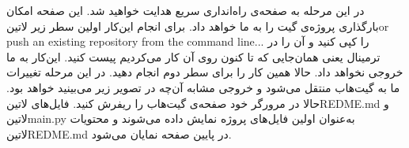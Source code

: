 در این مرحله به صفحه‌ی راه‌انداری سریع هدایت خواهید شد. این صفحه امکان بارگذاری پروژه‌ی گیت را به ما خواهد داد. برای انجام این‌کار اولین سطر زیر ‌لاتین{or push an existing repository from the command line...} را کپی کنید و آن را در ترمینال یعنی همان‌جایی که تا کنون روی آن کار می‌کردیم پیست کنید. این‌کار به ما خروجی نخواهد داد. حالا همین کار را برای سطر دوم انجام دهید. در این مرحله تغییرات ما به گیت‌هاب منتقل می‌شود و خروجی مشابه آن‌چه در تصویر زیر می‌بینید خواهد بود. حالا در مرورگر خود صفحه‌ی گیت‌هاب را ریفرش کنید. فایل‌های ‌لاتین{REDME.md} و ‌لاتین{main.py} به‌عنوان اولین فایل‌های پروژه نمایش داده می‌شوند و محتویات ‌لاتین{REDME.md} در پایین صفحه نمایان می‌شود.

